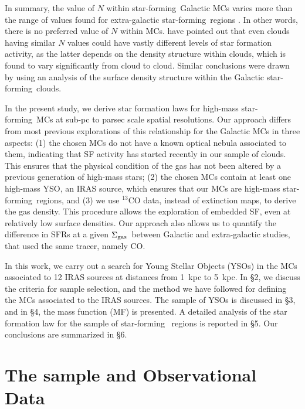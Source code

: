 \documentclass[iop]{emulateapj}
\newcommand{\starf}{star-forming}
\newcommand{\siggas}{$\Sigma_{\rm gas}$}
\begin{document}
In summary, the value of $N$ within \starf\ Galactic MCs varies more than the 
range of values found for extra-galactic \starf\ regions \citep{kennicutt+12, bigiel+08}.
In other words, there is no preferred value of $N$ within MCs.
\citet{lada+13} have pointed out that even clouds having similar $N$ values could have 
vastly different levels of star formation activity, as the latter 
depends on the density structure within clouds, which is found to
vary significantly from cloud to cloud. Similar conclusions were drawn by 
\citet{burkert+hartmann13} using an analysis of the surface density structure 
within the Galactic \starf~clouds.

In the present study, we derive star formation laws for 
high-mass \starf\ MCs at sub-pc to parsec scale spatial resolutions.
Our approach differs from most previous explorations of this relationship for 
the Galactic MCs in three aspects: (1) the chosen MCs do not have a known 
optical nebula associated to them, indicating that 
SF activity has started recently in our sample of clouds.
This ensures that the physical condition of the gas has not been altered by
a previous generation of high-mass stars;
(2) the chosen MCs contain at least one high-mass YSO, an IRAS source, 
which ensures that our MCs are high-mass \starf\ regions, and
(3) we use $^{13}$CO data, instead of extinction maps, to derive the gas density. 
This procedure allows the exploration of embedded SF, even at relatively 
low surface densities. Our approach  also allows us to quantify  
the difference in SFRs at a given \siggas\ between Galactic and extra-galactic
studies, that used the same tracer, namely CO.

In this work, we carry out a search for Young Stellar Objects (YSOs) in 
the MCs associated to 12 IRAS sources at distances from 1~kpc to 5~kpc.
In \S2, we discuss the criteria for sample selection, and the method we have
followed for defining the MCs associated to the IRAS sources.  
The sample of YSOs is discussed in \S3, and in \S4, the mass function (MF)
is presented. A detailed analysis of the star formation law for the sample of \starf~
regions is reported in \S5. Our conclusions are summarized in \S6.

\section{The sample and Observational Data}
\end{document}
